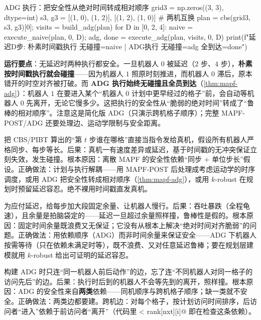 \begin{codebox}[Python]{ADG 执行：把安全性从绝对时间转成相对顺序}
grid3 = np.zeros((3, 3), dtype=int)
s3, g3 = [(1, 0), (1, 2)], [(1, 2), (1, 0)]        # 两机互换
plan = cbs(grid3, s3, g3)[0]; visits = build_adg(plan)
for D in [0, 2, 4]:
    naive = execute_naive(plan, 0, D); adg, done = execute_adg(plan, visits, 0, D)
    print(f"延迟{D}步: 朴素时间戳执行 无碰撞={naive} | ADG执行 无碰撞={adg} 全到达={done}")
\end{codebox}

\textbf{运行要点}：无延迟时两种执行都安全。一旦机器人 $0$ 被延迟（$2$ 步、$4$ 步），\textbf{朴素按时间戳执行就会碰撞}——因为机器人 $1$ 照原时刻推进，而机器人 $0$ 滞后，原本错开的时空对齐被打破。而 \textbf{ADG 执行始终无碰撞且全员到达}（\cref{thm:mapf-adg}）：机器人 $1$ 在要进入某个“机器人 $0$ 计划中更早经过的格子”前，会自动等机器人 $0$ 先离开，无论它慢多少。这把执行的安全性从“脆弱的绝对时间”转成了“鲁棒的相对顺序”。注意这是简化版 ADG（只演示跨机格子顺序）；完整 MAPF-POST/ADG 还要处理边、运动学限制与安全距离。

\begin{pitfall}
把 CBS/PIBT 算出的“第 $t$ 步谁在哪格”直接当指令发给真机，假设所有机器人严格同步、每步等长。后果：真机一有速度差异或延迟，基于时间戳的无冲突保证立刻失效，发生碰撞。根本原因：离散 MAPF 的安全性依赖“同步 $+$ 单位步长”假设。正确做法：计划与执行解耦——用 MAPF-POST 后处理成考虑运动学的时序调度，或用 ADG 把安全性转成相对顺序（\cref{thm:mapf-adg}），或用 $k$-robust 在规划时预留延迟容忍。绝不裸用时间戳直发真机。
\end{pitfall}

\begin{pitfall}
为应付延迟，给每步加大段固定余量、让机器人慢行。后果：吞吐暴跌（全程龟速），且余量是拍脑袋定的——延迟一旦超过余量照样撞，鲁棒性是假的。根本原因：固定时间余量既浪费又无保证；它没有从根本上解决“绝对时间对齐脆弱”的问题。正确做法：用依赖顺序（ADG）而非时间余量来保证安全——ADG 下机器人按需等待（只在依赖未满足时等），既不浪费、又对任意延迟鲁棒；要在规划层建模就用 $k$-robust 给出可证明的延迟容忍。
\end{pitfall}

\begin{pitfall}
构建 ADG 时只连“同一机器人前后动作”的边，忘了连“不同机器人对同一格子的访问先后”的边。后果：执行时后到的机器人不会等先到的离开，照样撞。根本原因：ADG 的安全性来自\textbf{两类}依赖——同机顺序与跨机格子顺序；缺一类就不安全。正确做法：两类边都要建。跨机边：对每个格子，按计划访问时间排序，后访问者“进入”依赖于前访问者“离开”（代码里 \verb@left[nxt] < rank[nxt][i]@ 即在检查这条依赖）。
\end{pitfall}


